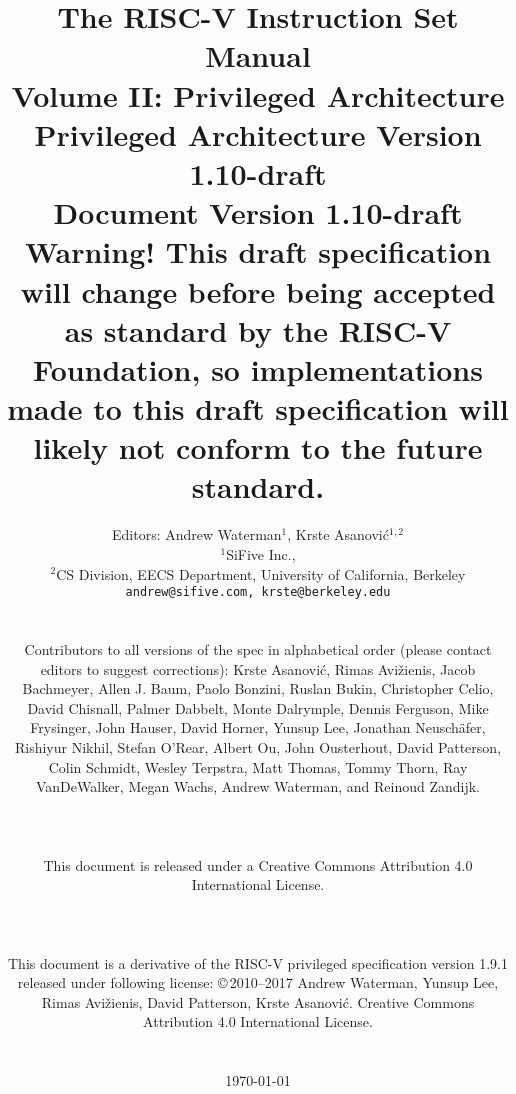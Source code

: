 \documentclass[twoside,11pt]{book}
\newcommand{\privrev}{1.10-draft}
\begin{document}
\title{{\vspace{-0.7in}\Large {\bf The RISC-V Instruction Set Manual}} \\
  \large {\bf Volume II: Privileged Architecture} \\
  Privileged Architecture Version \privrev \\
  Document Version \privrev \\
    {\bf Warning! This draft specification
    will change before being accepted as standard by the RISC-V Foundation, so
    implementations made to this draft specification will likely not conform
    to the future standard.}
  \vspace{-0.1in}}

\author{Editors: Andrew Waterman$^{1}$, Krste Asanovi\'{c}$^{1,2}$ \\
  $^{1}$SiFive Inc., \\
  $^{2}$CS Division, EECS Department, University of California, Berkeley \\
  {\tt andrew@sifive.com, krste@berkeley.edu} \\
  \\
  \parbox{\textwidth}{
  Contributors to all versions of the spec in alphabetical order
  (please contact editors to suggest corrections): Krste Asanovi\'{c},
  Rimas Avi\v{z}ienis, Jacob Bachmeyer, Allen J. Baum, Paolo Bonzini,
  Ruslan Bukin, Christopher Celio, David Chisnall, Palmer Dabbelt,
  Monte Dalrymple, Dennis Ferguson, Mike Frysinger, John Hauser, David
  Horner, Yunsup Lee, Jonathan Neusch{\"a}fer, Rishiyur Nikhil, Stefan
  O'Rear, Albert Ou, John Ousterhout, David Patterson, Colin Schmidt,
  Wesley Terpstra, Matt Thomas, Tommy Thorn, Ray VanDeWalker,
  Megan Wachs, Andrew Waterman, and Reinoud Zandijk.}
  \\
  \\
  \parbox{\textwidth}{
  This document is released under a Creative Commons Attribution 4.0
  International License.
  }
  \\
  \\
  \parbox{\textwidth}{
    This document is a derivative of the RISC-V
    privileged specification version 1.9.1 released under following license:
    \copyright \,2010--2017 Andrew Waterman, Yunsup Lee, Rimas
    Avi\v{z}ienis, David Patterson, Krste Asanovi\'{c}. 
    Creative Commons Attribution 4.0 International License.
  }
  \\
  \\
  \today
}

\date{} 
\maketitle
\end{document}
